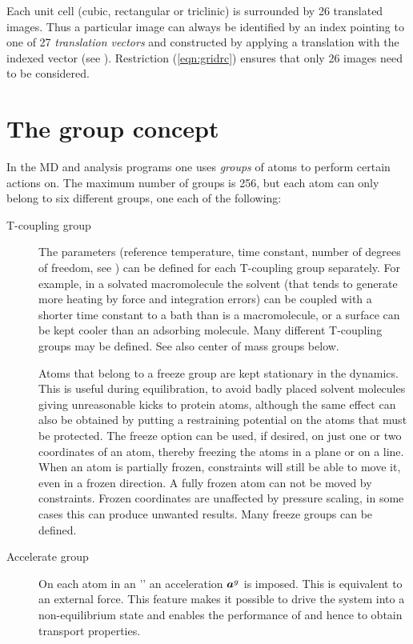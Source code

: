 Each unit cell (cubic, rectangular or triclinic)
is surrounded by 26 translated images. Thus a
particular image can always be identified by an index pointing to one
of 27 {\em translation vectors} and constructed by applying a
translation with the indexed vector (see ).
Restriction (\ref{eqn:gridrc}) ensures that only 26 images need to be
considered.

\section{The group concept}
\label{sec:group}
In the {\gromacs} MD and analysis programs one uses {\em groups} of
atoms to perform certain actions on. The maximum number of groups is
256, but each atom can only belong to six different groups, one 
each of the following:
\begin{description}
\item[T-coupling group]
The  parameters (reference
temperature, time constant, number of degrees of freedom, see
) can be defined for each T-coupling group
separately. For example, in a solvated macromolecule the solvent (that
tends to generate more heating by force and integration errors) can be
coupled with a shorter time constant to a bath than is a macromolecule,
or a surface can be kept cooler than an adsorbing molecule. Many
different T-coupling groups may be defined. See also center of mass
groups below.

\item[]
Atoms that belong to a freeze group are kept stationary in the
dynamics. This is useful during equilibration, {\eg} to avoid badly
placed solvent molecules giving unreasonable kicks to protein atoms,
although the same effect can also be obtained by putting a restraining
potential on the atoms that must be protected. The freeze option can
be used, if desired, on just one or two coordinates of an atom,
thereby freezing the atoms in a plane or on a line.
When an atom is partially frozen, constraints will still be able to move it,
even in a frozen direction. A fully frozen atom can not be moved by
constraints.
Frozen coordinates are unaffected by pressure scaling, in some cases this
can produce unwanted results.
Many freeze groups can be defined.

\item[Accelerate group]
On each atom in an '' an acceleration
$\mbox{\boldmath ${a}$}^g$ is imposed. This is equivalent to an external
force. This feature makes it possible to drive the system into a
non-equilibrium state and enables the performance of 
 and hence to obtain transport properties.


\end{description}
